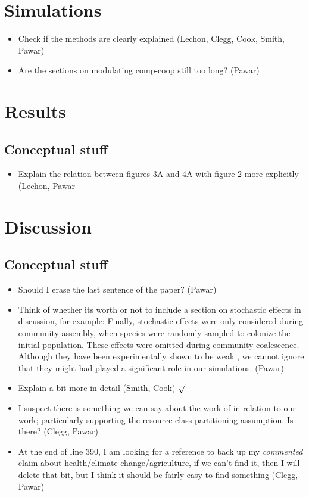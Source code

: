 \documentclass{article}
\begin{document}
    \section{Simulations}
    \begin{itemize}
        \item Check if the methods are clearly explained (Lechon, Clegg, Cook, Smith, Pawar)
        \item Are the sections on modulating comp-coop still too long? (Pawar)
    \end{itemize}
    \section{Results}
    \subsection{Conceptual stuff}
    \begin{itemize}
        \item Explain the relation between figures 3A and 4A with figure 2 more explicitly (Lechon, Pawar
    \end{itemize}
    \section{Discussion}
    \subsection{Conceptual stuff}
    \begin{itemize}
        \item Should I erase the last sentence of the paper? (Pawar)
        \item Think of whether its worth or not to include a section on stochastic effects in discussion, for example: Finally, stochastic effects were only considered during community assembly, when species were randomly sampled to colonize the initial population. These effects were omitted during community coalescence. Although they have been experimentally shown to be weak \citep{Sierocinki2021}, we cannot ignore that they might had played a significant role in our simulations. (Pawar)
        \item Explain \cite{Yamagishi2020, Yamagishi2020a} a bit more in detail (Smith, Cook) $\surd$
        \item I suspect there is something we can say about the work of \cite{Enke2019, Fant2021, Goldford2018} in relation to our work; particularly supporting the resource class partitioning assumption. Is there? (Clegg, Pawar)
        \item At the end of line 390, I am looking for a reference to back up my \textit{commented} claim about health/climate change/agriculture, if we can't find it, then I will delete that bit, but I think it should be fairly easy to find something (Clegg, Pawar)
    \end{itemize}
    
\end{document}
